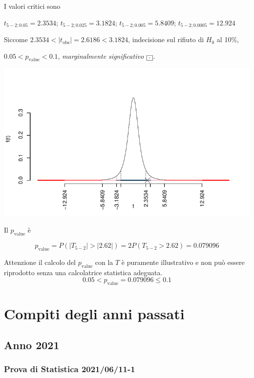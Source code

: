 \documentclass[
  11pt,
]{book}
\theoremstyle{mytheoremstyle}
\theoremstyle{mydefstyle}
\newenvironment{sol}
  {
  \begin{tcolorbox}[enhanced,breakable,arc=0.1mm,boxrule=1pt,colback=white,colframe=iblue,
  title=\bf \fontfamily{lmss}\selectfont \hspace{.5 cm} Soluzione,drop fuzzy shadow]

}{
\end{tcolorbox}
  }
\begin{document}
\begin{sol}
I valori critici sono

\(t_{5-2;0.05}=2.3534\); \(t_{5-2;0.025}=3.1824\); \(t_{5-2;0.005}=5.8409\); \(t_{5-2;0.0005}=12.924\)

Siccome \(2.3534<|t_\text{obs}|=2.6186<3.1824\), indecisione sul rifiuto di \(H_0\) al 10\%,

\(0.05<p_\text{value}<0.1\), \emph{marginalmente significativo} \(\fbox{.}\).

\begin{center}\includegraphics{Esami_passati_con_soluzioni_files/figure-latex/06-regr-42,-1} \end{center}

Il \(p_{\text{value}}\) è

\[ p_{\text{value}} = P(|T_{5-2}|>|2.62|)=2P(T_{5-2}>2.62)=0.079096 \]

Attenzione il calcolo del \(p_\text{value}\) con la \(T\) è puramente illustrativo e non può essere riprodotto senza una calcolatrice statistica adeguata.\[
 0.05 < p_\text{value}= 0.079096 \leq 0.1 
\]

\end{sol}

\part{Compiti degli anni passati}

\chapter{Anno 2021}\label{anno-2021}

\section{Prova di Statistica 2021/06/11-1}\label{prova-di-statistica-20210611-1}
\end{document}
